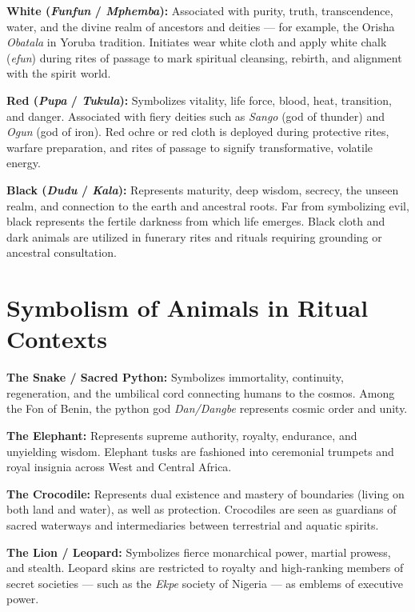 \documentclass[12pt,a4paper]{article}
\begin{document}
\textbf{White (\textit{Funfun} / \textit{Mphemba}):} Associated with purity, truth, transcendence, water, and the divine realm of ancestors and deities --- for example, the Orisha \textit{Obatala} in Yoruba tradition. Initiates wear white cloth and apply white chalk (\textit{efun}) during rites of passage to mark spiritual cleansing, rebirth, and alignment with the spirit world.

\textbf{Red (\textit{Pupa} / \textit{Tukula}):} Symbolizes vitality, life force, blood, heat, transition, and danger. Associated with fiery deities such as \textit{Sango} (god of thunder) and \textit{Ogun} (god of iron). Red ochre or red cloth is deployed during protective rites, warfare preparation, and rites of passage to signify transformative, volatile energy.

\textbf{Black (\textit{Dudu} / \textit{Kala}):} Represents maturity, deep wisdom, secrecy, the unseen realm, and connection to the earth and ancestral roots. Far from symbolizing evil, black represents the fertile darkness from which life emerges. Black cloth and dark animals are utilized in funerary rites and rituals requiring grounding or ancestral consultation.

\section{Symbolism of Animals in Ritual Contexts}

\textbf{The Snake / Sacred Python:} Symbolizes immortality, continuity, regeneration, and the umbilical cord connecting humans to the cosmos. Among the Fon of Benin, the python god \textit{Dan/Dangbe} represents cosmic order and unity.

\textbf{The Elephant:} Represents supreme authority, royalty, endurance, and unyielding wisdom. Elephant tusks are fashioned into ceremonial trumpets and royal insignia across West and Central Africa.

\textbf{The Crocodile:} Represents dual existence and mastery of boundaries (living on both land and water), as well as protection. Crocodiles are seen as guardians of sacred waterways and intermediaries between terrestrial and aquatic spirits.

\textbf{The Lion / Leopard:} Symbolizes fierce monarchical power, martial prowess, and stealth. Leopard skins are restricted to royalty and high-ranking members of secret societies --- such as the \textit{Ekpe} society of Nigeria --- as emblems of executive power.
\end{document}
